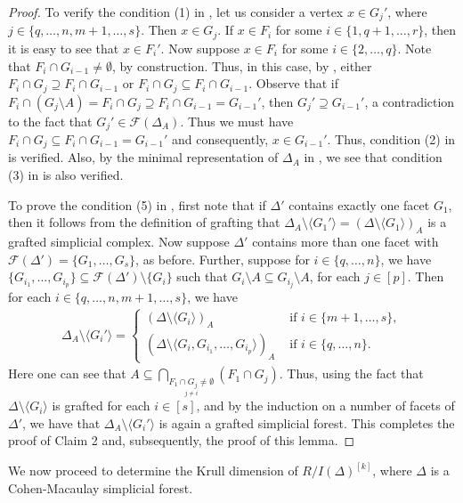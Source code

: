\documentclass[12pt,a4paper,reqno]{amsart}
\theoremstyle{definition}
\def\D{\Delta}
\def\F{\mathcal{F}}
\def\l{\langle}
\def\r{\rangle}
\begin{document}
\begin{proof}
To verify the condition (1) in , let us consider a vertex $x\in G_j'$, where $j\in\{q,\ldots,n,m+1,\ldots,s\}$. Then $x\in G_j$. If $x\in F_i$ for some $i\in\{1,q+1,\ldots,r\}$, then it is easy to see that $x\in F_i'$. Now suppose $x\in F_i$ for some $i\in\{2,\ldots,q\}$. Note that $F_i\cap G_{i-1}\neq\emptyset$, by construction. Thus, in this case, by , either $F_i\cap G_j\supseteq F_i\cap G_{i-1}$ or $F_i\cap G_j\subseteq F_i\cap G_{i-1}$. Observe that if $F_i\cap (G_j\setminus A)=F_i\cap G_j\supseteq F_i\cap G_{i-1}=G_{i-1}'$, then $G_j'\supseteq G_{i-1}'$, a contradiction to the fact that $G_j'\in\F(\D_A)$. Thus we must have $F_i\cap G_j\subseteq F_i\cap G_{i-1}=G_{i-1}'$ and consequently, $x\in G_{i-1}'$. Thus, condition (2) in  is verified. Also, by the minimal representation of $\D_A$ in , we see that condition (3) in  is also verified. 

To prove the condition (5) in , first note that if $\D'$ contains exactly one facet $G_1$, then it follows from the definition of grafting that $\D_A\setminus \l G_1'\r=(\D\setminus \l G_1\r)_A$ is a grafted simplicial complex.
Now suppose $\D'$ contains more than one facet with $\F(\D')=\{G_1,\ldots,G_s\}$, as before. Further, suppose for $i\in\{q,\ldots,n\}$, we have $\{G_{i_1},\ldots,G_{i_p}\}\subseteq \F(\D')\setminus\{G_i\}$ such that $G_i\setminus A\subseteq G_{i_j}\setminus A$, for each $j\in[p]$. Then for each $i\in\{q,\ldots,n,m+1,\ldots,s\}$, we have
\begin{align*}
    \D_A\setminus \l G_i'\r=\begin{cases}
        (\D\setminus \l G_i\r)_A&\text{ if }i\in\{m+1,\ldots,s\},\\
        (\D\setminus\l G_i,G_{i_1},\ldots,G_{i_p}\r)_A&\text{ if }i\in\{q,\ldots,n\}.
    \end{cases}
\end{align*}
Here one can see that $A\subseteq \bigcap_{\underset{j\neq i}{F_1\cap G_j\neq\emptyset}}(F_1\cap G_j)$. Thus, using the fact that $\D\setminus \l G_i\r$ is grafted for each $i\in[s]$, and by the induction on a number of facets of $\D'$, we have that $\D_A\setminus\l G_i'\r$ is again a grafted simplicial forest. This completes the proof of Claim 2 and, subsequently, the proof of this lemma.
\end{proof}

We now proceed to determine the Krull dimension of $R/I(\Delta)^{[k]}$, where $\D$ is a Cohen-Macaulay simplicial forest.
\end{document}
